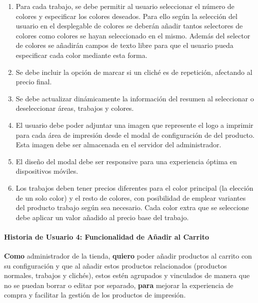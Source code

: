 \documentclass[12pt]{article}
\newcommand{\subsubsubsection}[1]{\paragraph{#1}}
\begin{document}
\begin{enumerate}[label=\arabic*.]
    \item Para cada trabajo, se debe permitir al usuario seleccionar el número de colores y especificar los colores deseados. Para ello según la selección del usuario en el desplegable de colores se deberán añadir tantos selectores de colores como colores se hayan seleccionado en el mismo. Además del selector de colores se añadirán campos de texto libre para que el usuario pueda especificar cada color mediante esta forma.
    \item Se debe incluir la opción de marcar si un cliché es de repetición, afectando al precio final.
    \item Se debe actualizar dinámicamente la información del resumen al seleccionar o deseleccionar áreas, trabajos y colores.
    \item El usuario debe poder adjuntar una imagen que represente el logo a imprimir para cada área de impresión desde el modal de configuración de del producto. Esta imagen debe ser almacenada en el servidor del administrador.
    \item El diseño del modal debe ser responsive para una experiencia óptima en dispositivos móviles.
    \item Los trabajos deben tener precios diferentes para el color principal (la elección de un solo color) y el resto de colores, con posibilidad de emplear variantes del producto trabajo según sea necesario. Cada color extra que se seleccione debe aplicar un valor añadido al precio base del trabajo.
\end{enumerate}


\subsubsubsection{Historia de Usuario 4: Funcionalidad de Añadir al Carrito}\label{sec:historia4}

\textbf{Como} administrador de la tienda,
\textbf{quiero} poder añadir productos al carrito con su configuración y que al añadir estos productos relacionados (productos normales, trabajos y clichés), estos estén agrupados y vinculados de manera que no se puedan borrar o editar por separado,
\textbf{para} mejorar la experiencia de compra y facilitar la gestión de los productos de impresión.
\end{document}
